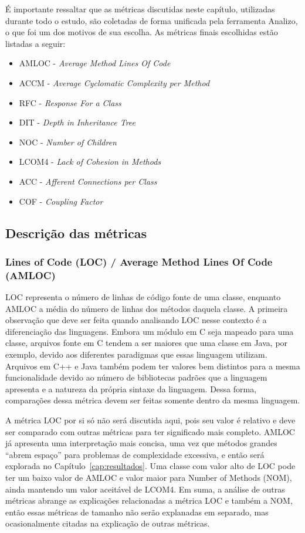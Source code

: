 É importante ressaltar que as métricas discutidas neste capítulo, utilizadas durante todo o estudo, são coletadas de forma unificada pela ferramenta Analizo, o que foi um dos motivos de sua escolha. As métricas finais escolhidas estão listadas a seguir:

\begin{itemize}
\item AMLOC - \textit{Average Method Lines Of Code}
\item ACCM - \textit{Average Cyclomatic Complexity per Method}
\item RFC - \textit{Response For a Class}
\item DIT - \textit{Depth in Inheritance Tree}
\item NOC - \textit{Number of Children}
\item LCOM4 - \textit{Lack of Cohesion in Methods}
\item ACC - \textit{Afferent Connections per Class}
\item COF - \textit{Coupling Factor}
\end{itemize}

\subsection{Descrição das métricas}

\subsubsection{Lines of Code (LOC) / Average Method Lines Of Code (AMLOC)}

LOC representa o número de linhas de código fonte de uma classe, enquanto AMLOC a média do número de linhas dos métodos daquela classe. A primeira observação que deve ser feita quando analisando LOC nesse contexto é a diferenciação das linguagens. Embora um módulo em C seja mapeado para uma classe, arquivos fonte em C tendem a ser maiores que uma classe em Java, por exemplo, devido aos diferentes paradigmas que essas linguagem utilizam. Arquivos em C++ e Java também podem ter valores bem distintos para a mesma funcionalidade devido ao número de bibliotecas padrões que a linguagem apresenta e a natureza da própria sintaxe da linguagem. Dessa forma, comparações dessa métrica devem ser feitas somente dentro da mesma linguagem. 

A métrica LOC por si só não será discutida aqui, pois seu valor é relativo e deve ser comparado com outras métricas para ter significado mais completo. AMLOC já apresenta uma interpretação mais concisa, uma vez que métodos grandes ``abrem espaço'' para problemas de complexidade excessiva, e então será explorada no Capítulo~\ref{cap:resultados}. Uma classe com valor alto de LOC pode ter um baixo valor de AMLOC e valor maior para Number of Methods (NOM), ainda mantendo um valor aceitável de LCOM4. Em suma, a análise de outras métricas abrange as explicações relacionadas a métrica LOC e também a NOM, então essas métricas de tamanho não serão explanadas em separado, mas ocasionalmente citadas na explicação de outras métricas.

